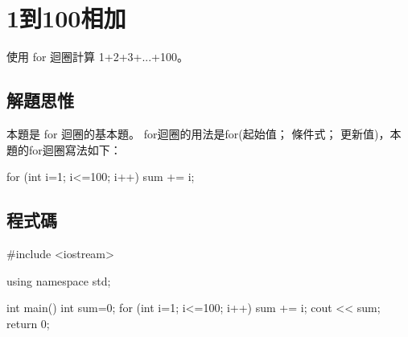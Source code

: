 \section{1到100相加}
使用 for 迴圈計算 1+2+3+...+100。

\subsection{解題思惟}
本題是 for 迴圈的基本題。
for迴圈的用法是for(起始值； 條件式； 更新值)，本題的for迴圈寫法如下：
\begin{inside}
	for (int i=1; i<=100; i++) sum += i;
\end{inside}
			
\subsection{程式碼}
\begin{cppcode}
	#include <iostream>
	
	using namespace std;
	
	int main()
	{
		int sum=0;
		for (int i=1; i<=100; i++) sum += i;
		cout << sum;
		return 0;
	}
\end{cppcode}
